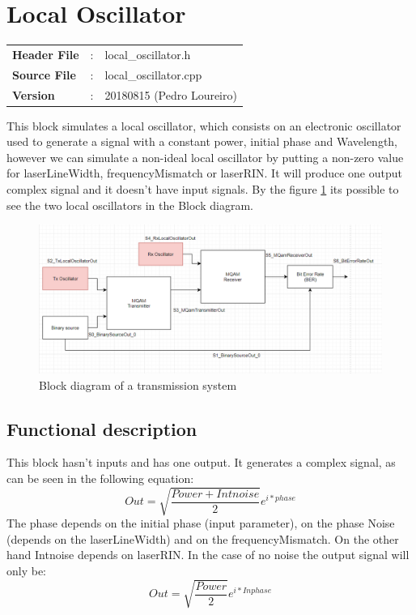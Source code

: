 \clearpage

\section{Local Oscillator}

\begin{tcolorbox}	
	\begin{tabular}{p{2.75cm} p{0.2cm} p{10.5cm}} 	
		\textbf{Header File}   &:& local\_oscillator.h \\
		\textbf{Source File}   &:& local\_oscillator.cpp \\
        \textbf{Version}       &:& 20180815 (Pedro Loureiro)\\
	\end{tabular}
\end{tcolorbox}

This block simulates a local oscillator, which consists on an electronic oscillator used to generate a signal with a constant power, initial phase and Wavelength,  however we can simulate a non-ideal local oscillator by putting a non-zero value for laserLineWidth, frequencyMismatch or laserRIN. It will produce one output complex signal and it doesn't have input signals. By the figure \ref{Blocos} its possible to see the two local oscillators in the Block diagram.

\begin{figure}[H]
	\centering
	\includegraphics[scale=0.75]{./lib/local_oscillator/Figures/Diagrama_Blocos.png}
	\caption{Block diagram of a transmission system}\label{Blocos}
\end{figure}

\subsection*{Functional description}

This block hasn't inputs and has one output. It generates a complex signal, as can be seen in the following equation:
\begin{equation*}
Out=\sqrt{\frac{Power+Intnoise}{2}}e^{i*phase}
\end{equation*}
The phase depends on the initial phase (input parameter), on the phase Noise (depends on the laserLineWidth) and on the frequencyMismatch. On the other hand Intnoise depends on laserRIN. In the case of no noise the output signal will only be: \newline
\begin{equation*}
Out=\sqrt{\frac{Power}{2}}e^{i*Inphase}
\end{equation*}

